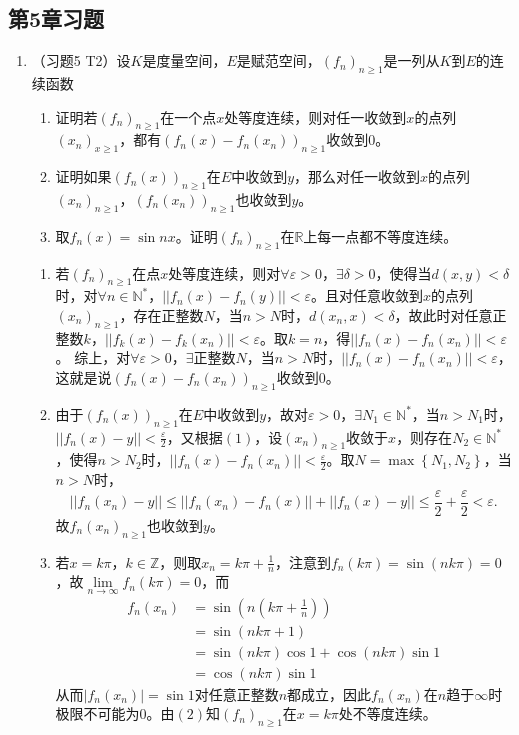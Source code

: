 \subsection{第5章习题}
\begin{enumerate}
  \item （习题5 T2）设$K$是度量空间，$E$是赋范空间，$(f_n)_{n\geqslant 1}$是一列从$K$到$E$的连续函数
    \begin{enumerate}
      \item 证明若$(f_n)_{n\geqslant1}$在一个点$x$处等度连续，则对任一收敛到$x$的点列$(x_n)_{x\geqslant 1}$，都有$(f_n(x)-f_n(x_n))_{n\geqslant 1}$收敛到$0$。
      \item 证明如果$(f_n(x))_{n\geqslant 1}$在$E$中收敛到$y$，那么对任一收敛到$x$的点列$(x_n)_{n\geqslant1}$，$(f_n(x_n))_{n\geqslant1}$也收敛到$y$。
      \item 取$f_n(x)=\sin nx$。证明$(f_n)_{n\geqslant 1}$在$\mathbb{R}$上每一点都不等度连续。
    \end{enumerate}
    \begin{answer}
      \begin{enumerate}
        \item 若$(f_n)_{n\geqslant 1}$在点$x$处等度连续，则对$\forall \varepsilon>0$，$\exists \delta>0$，使得当$d(x,y)<\delta$时，对$\forall n\in\mathbb{N}^*$，$||f_n(x)-f_n(y)||<\varepsilon$。且对任意收敛到$x$的点列$(x_n)_{n\geqslant 1}$，存在正整数$N$，当$n>N$时，$d(x_n,x)<\delta$，故此时对任意正整数$k$，$||f_k(x)-f_k(x_n)||<\varepsilon$。取$k=n$，得$||f_n(x)-f_n(x_n)||<\varepsilon$。 综上，对$\forall \varepsilon>0$，$\exists$正整数$N$，当$n>N$时，$||f_n(x)-f_n(x_n)||<\varepsilon$，这就是说$(f_n(x)-f_n(x_n))_{n\geqslant 1}$收敛到$0$。 
        \item 由于$(f_n(x))_{n\geqslant 1}$在$E$中收敛到$y$，故对$\varepsilon>0$，$\exists N_1\in\mathbb{N}^*$，当$n>N_1$时，$||f_n(x)-y||<\frac{\varepsilon}{2}$，又根据$(1)$，设$(x_n)_{n\geqslant 1}$收敛于$x$，则存在$N_2\in\mathbb{N}^*$，使得$n>N_2$时，$||f_n(x)-f_n(x_n)||<\frac{\varepsilon}{2}$。取$N=\max\left\{N_1,N_2\right\}$，当$n>N$时，
        \[||f_n(x_n)-y||\leqslant ||f_n(x_n)-f_n(x)||+||f_n(x)-y||\leqslant \dfrac{\varepsilon}{2}+\dfrac{\varepsilon}{2}<\varepsilon.\] 
        故$f_n(x_n)_{n\geqslant 1}$也收敛到$y$。 
        \item 若$x=k\pi$，$k\in\mathbb{Z}$，则取$x_n=k\pi+\frac{1}{n}$，注意到$f_n(k\pi)=\sin(nk\pi)=0$，故$\lim\limits_{n\rightarrow \infty}f_n(k\pi)=0$，而\[\begin{aligned}
          f_n(x_n)&=\sin(n(k\pi+\frac{1}{n}))\\&=\sin(nk\pi+1)\\
          &=\sin(nk\pi)\cos1+\cos(nk\pi)\sin1\\&=\cos(nk\pi)\sin1
        \end{aligned}\]
      从而$|f_n(x_n)|=\sin 1$对任意正整数$n$都成立，因此$f_n(x_n)$在$n$趋于$\infty$时极限不可能为$0$。由$(2)$知$(f_n)_{n\geqslant 1}$在$x=k\pi$处不等度连续。 
      

\end{enumerate}
\end{answer}
\end{enumerate}
